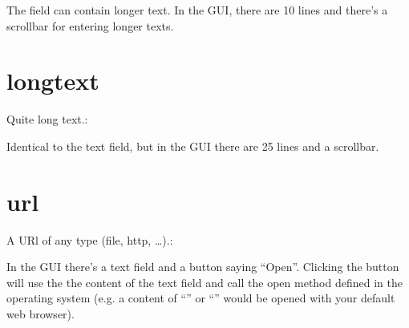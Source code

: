 \documentclass[letterpaper,10pt,english]{sphinxmanual}
\begin{document}
\sphinxAtStartPar
The field can contain longer text. In the GUI, there are 10 lines and there’s a scrollbar for entering longer texts.


\section{longtext}
\label{\detokenize{data-fields:longtext}}
\sphinxAtStartPar
Quite long text.:

\begin{sphinxVerbatim}[commandchars=\\\{\}]
    
\end{sphinxVerbatim}

\sphinxAtStartPar
Identical to the text field, but in the GUI there are 25 lines and a scrollbar.


\section{url}
\label{\detokenize{data-fields:url}}
\sphinxAtStartPar
A URl of any type (file, http, …).:

\begin{sphinxVerbatim}[commandchars=\\\{\}]
    
\end{sphinxVerbatim}

\sphinxAtStartPar
In the GUI there’s a text field and a button saying “Open”. Clicking the button will use the the content of the text field and call the open method defined in the operating system (e.g. a content of “” or “” would be opened with your default web browser).
\end{document}
